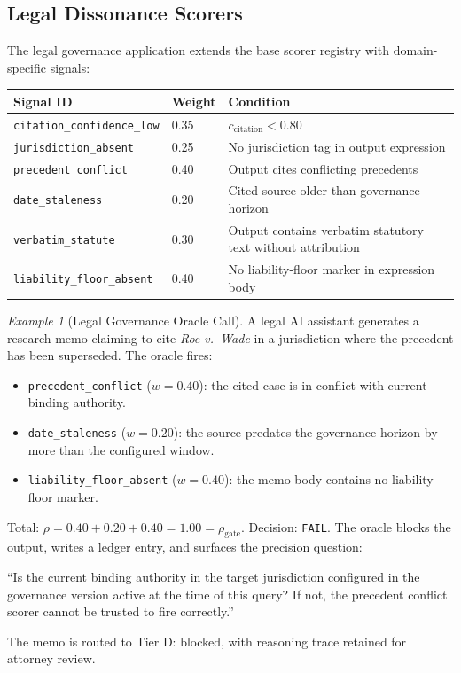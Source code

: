 \documentclass[11pt,letterpaper]{article}
\theoremstyle{remark}
\newtheorem{example}[theorem]{Example}
\newcommand{\rhogate}{\rho_{\mathrm{gate}}}
\newcommand{\rhosys}{\rho}
\begin{document}
\subsection{Legal Dissonance Scorers}

The legal governance application extends the base scorer registry with
domain-specific signals:

\begin{center}
\begin{tabular}{lll}
\toprule
\textbf{Signal ID} & \textbf{Weight} & \textbf{Condition} \\
\midrule
\texttt{citation\_confidence\_low}   & 0.35 &
  $c_{\text{citation}} < 0.80$ \\
\texttt{jurisdiction\_absent}        & 0.25 &
  No jurisdiction tag in output expression \\
\texttt{precedent\_conflict}         & 0.40 &
  Output cites conflicting precedents \\
\texttt{date\_staleness}             & 0.20 &
  Cited source older than governance horizon \\
\texttt{verbatim\_statute}           & 0.30 &
  Output contains verbatim statutory text
  without attribution \\
\texttt{liability\_floor\_absent}    & 0.40 &
  No liability-floor marker in expression body \\
\bottomrule
\end{tabular}
\end{center}

\begin{example}[Legal Governance Oracle Call]
A legal AI assistant generates a research memo claiming to cite
\textit{Roe v.\ Wade} in a jurisdiction where the precedent has been
superseded.  The oracle fires:
\begin{itemize}[leftmargin=1.5em]
  \item \texttt{precedent\_conflict} ($w = 0.40$): the cited case is
        in conflict with current binding authority.
  \item \texttt{date\_staleness} ($w = 0.20$): the source predates the
        governance horizon by more than the configured window.
  \item \texttt{liability\_floor\_absent} ($w = 0.40$): the memo body
        contains no liability-floor marker.
\end{itemize}
Total: $\rhosys = 0.40 + 0.20 + 0.40 = 1.00 = \rhogate$.  Decision:
\texttt{FAIL}.  The oracle blocks the output, writes a ledger entry,
and surfaces the precision question:

\begin{precisionbox}
``Is the current binding authority in the target jurisdiction configured
in the governance version active at the time of this query?
If not, the precedent conflict scorer cannot be trusted to fire correctly.''
\end{precisionbox}

The memo is routed to Tier D: blocked, with reasoning trace retained
for attorney review.
\end{example}
\end{document}
